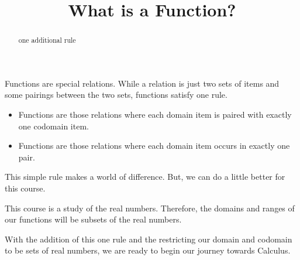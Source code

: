 \documentclass{ximera}
\title{What is a Function?}
\begin{document}
\begin{abstract}
one additional rule
\end{abstract}
\maketitle




Functions are special relations. While a relation is just two sets of items and some pairings between the two sets, functions satisfy one rule. 

\begin{itemize}
\item Functions are those relations where each domain item is paired with exactly one codomain item.
\item Functions are those relations where each domain item occurs in exactly one pair.
\end{itemize}


This simple rule makes a world of difference. But, we can do a little better for this course.

This course is a study of the real numbers.  Therefore, the domains and ranges of our functions will be subsets of the real numbers.


With the addition of this one rule and the restricting our domain and codomain to be sets of real numbers, we are ready to begin our journey towards Calculus.
\end{document}
